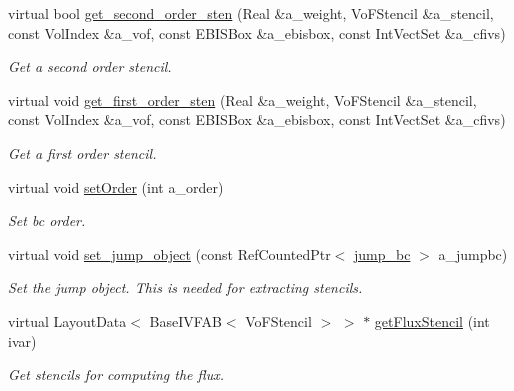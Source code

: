 \begin{DoxyCompactItemize}
virtual bool \hyperlink{classmfdirichletconductivityebbc_a3abb508cc49acbed2f9ed7661251bf1a}{get\+\_\+second\+\_\+order\+\_\+sten} (Real \&a\+\_\+weight, Vo\+F\+Stencil \&a\+\_\+stencil, const Vol\+Index \&a\+\_\+vof, const E\+B\+I\+S\+Box \&a\+\_\+ebisbox, const Int\+Vect\+Set \&a\+\_\+cfivs)
\begin{DoxyCompactList}\small\item\em Get a second order stencil. \end{DoxyCompactList}\item 
virtual void \hyperlink{classmfdirichletconductivityebbc_af63936a37e8e18649acfa4faa5c6fcfd}{get\+\_\+first\+\_\+order\+\_\+sten} (Real \&a\+\_\+weight, Vo\+F\+Stencil \&a\+\_\+stencil, const Vol\+Index \&a\+\_\+vof, const E\+B\+I\+S\+Box \&a\+\_\+ebisbox, const Int\+Vect\+Set \&a\+\_\+cfivs)
\begin{DoxyCompactList}\small\item\em Get a first order stencil. \end{DoxyCompactList}\item 
virtual void \hyperlink{classmfdirichletconductivityebbc_a5a54caed75c7b0f9502e740918396771}{set\+Order} (int a\+\_\+order)
\begin{DoxyCompactList}\small\item\em Set bc order. \end{DoxyCompactList}\item 
virtual void \hyperlink{classmfdirichletconductivityebbc_aa27f52ba5c4c2cb6e97ae3d6ced3f7e3}{set\+\_\+jump\+\_\+object} (const Ref\+Counted\+Ptr$<$ \hyperlink{classjump__bc}{jump\+\_\+bc} $>$ a\+\_\+jumpbc)
\begin{DoxyCompactList}\small\item\em Set the jump object. This is needed for extracting stencils. \end{DoxyCompactList}\item 
virtual Layout\+Data$<$ Base\+I\+V\+F\+AB$<$ Vo\+F\+Stencil $>$ $>$ $\ast$ \hyperlink{classmfdirichletconductivityebbc_a0d2598ccecd472e76b95f3ece8507f88}{get\+Flux\+Stencil} (int ivar)
\begin{DoxyCompactList}\small\item\em Get stencils for computing the flux. \end{DoxyCompactList}\end{DoxyCompactItemize}
